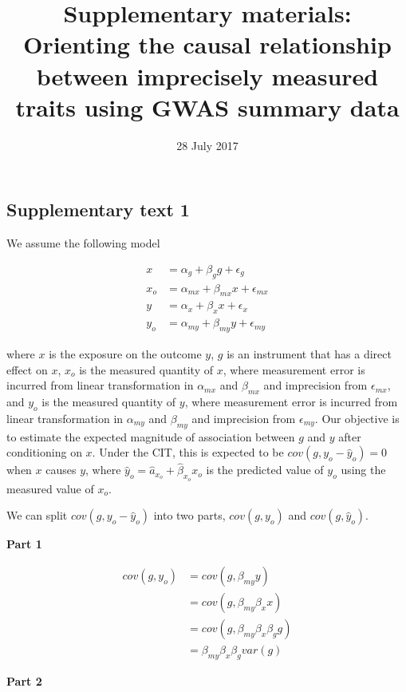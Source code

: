 \documentclass[]{article}
\title{Supplementary materials: Orienting the causal relationship between
imprecisely measured traits using GWAS summary data}
\author{}
\date{28 July 2017}
\begin{document}
\maketitle

\subsection{Supplementary text 1}\label{supplementary-text-1}

We assume the following model

\[
\begin{aligned}
x   & = \alpha_g + \beta_g g + \epsilon_g \\
x_o & = \alpha_{mx} + \beta_{mx} x + \epsilon_{mx} \\
y   & = \alpha_x + \beta_x x + \epsilon_x \\
y_o & = \alpha_{my} + \beta_{my} y + \epsilon_{my}
\end{aligned}
\]

where \(x\) is the exposure on the outcome \(y\), \(g\) is an instrument
that has a direct effect on \(x\), \(x_o\) is the measured quantity of
\(x\), where measurement error is incurred from linear transformation in
\(\alpha_{mx}\) and \(\beta_{mx}\) and imprecision from
\(\epsilon_{mx}\), and \(y_o\) is the measured quantity of \(y\), where
measurement error is incurred from linear transformation in
\(\alpha_{my}\) and \(\beta_{my}\) and imprecision from
\(\epsilon_{my}\). Our objective is to estimate the expected magnitude
of association between \(g\) and \(y\) after conditioning on \(x\).
Under the CIT, this is expected to be \(cov(g, y_o - \hat{y}_o) = 0\)
when \(x\) causes \(y\), where
\(\hat{y}_o = \hat{a}_{x_o} + \hat{\beta}_{x_o} x_o\) is the predicted
value of \(y_o\) using the measured value of \(x_o\).

We can split \(cov(g, y_o - \hat{y}_o)\) into two parts, \(cov(g, y_o)\)
and \(cov(g, \hat{y}_o)\).

\textbf{Part 1}

\[
\begin{aligned}
cov(g, y_o) & = cov(g, \beta_{my} y) \\
            & = cov(g, \beta_{my} \beta_x x) \\
            & = cov(g, \beta_{my} \beta_x \beta_g g) \\
            & = \beta_{my} \beta_x \beta_g var(g)
\end{aligned}
\]

\textbf{Part 2}
\end{document}

